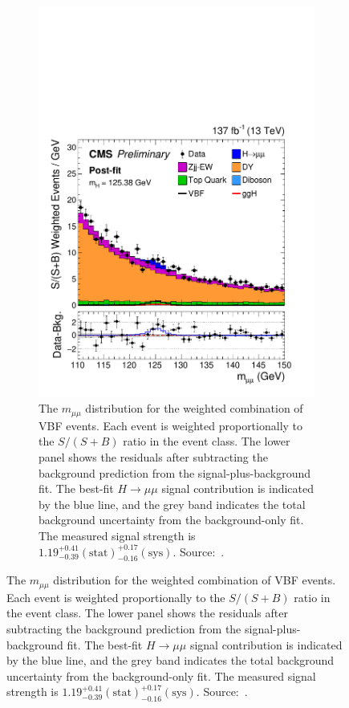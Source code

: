 \begin{figure}[htbp]
  \centering
  \begin{subfigure}[htbp]{0.48\textwidth}
    \centering
    \includegraphics[width=\textwidth]{figures_and_tables/theory/h_to_mumu_result.pdf}
    \caption{The $m_{\mu\mu}$ distribution for the weighted combination of VBF events. Each event is weighted proportionally to the $S/(S + B)$ ratio in the event class. The lower panel shows the residuals after subtracting the background prediction from the signal-plus-background fit. The best-fit $H \rightarrow \mu\mu$ signal contribution is indicated by the blue line, and the grey band indicates the total background uncertainty from the background-only fit. The measured signal strength is ${1.19^{+0.41}_{-0.39}(\mathrm{stat})^{+0.17}_{-0.16}(\mathrm{sys})}$. Source:~\cite{cms_higgs_mumu}.}
    \label{h_to_mumu_result}
  \end{subfigure}

\end{figure}
